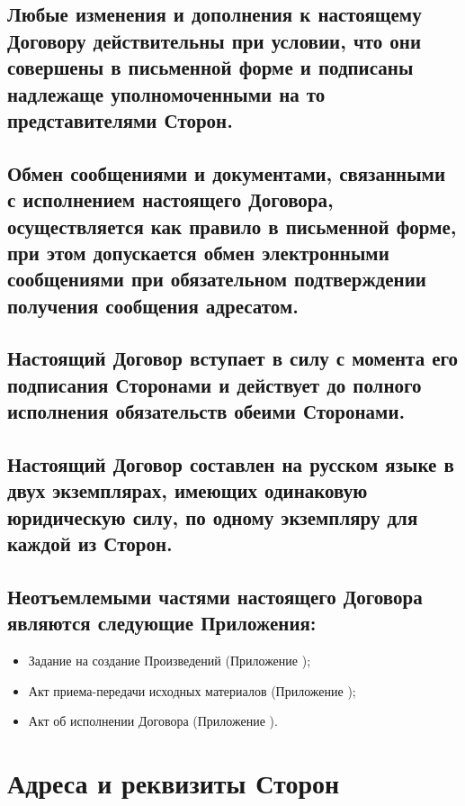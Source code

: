 \documentclass[12pt]{article}
\begin{document}
\subsection{Любые изменения и дополнения к настоящему Договору действительны при условии, что они совершены в письменной форме и подписаны надлежаще уполномоченными на то представителями Сторон.}

\subsection{Обмен сообщениями и документами, связанными с исполнением настоящего Договора, осуществляется как правило в письменной форме, при этом допускается обмен электронными сообщениями при обязательном подтверждении получения сообщения адресатом.}

\subsection{Настоящий Договор вступает в силу с момента его подписания Сторонами и действует до полного исполнения обязательств обеими Сторонами.}

\subsection{Настоящий Договор составлен на русском языке в двух экземплярах, имеющих одинаковую юридическую силу, по одному экземпляру для каждой из Сторон.}

\subsection{Неотъемлемыми частями настоящего Договора являются следующие Приложения:}

\begin{itemize}
\item Задание на создание Произведений (Приложение );
\item Акт приема-передачи исходных материалов (Приложение );
\item Акт об исполнении Договора (Приложение ).
\end{itemize}

\newpage
\section{Адреса и реквизиты Сторон}
\end{document}
